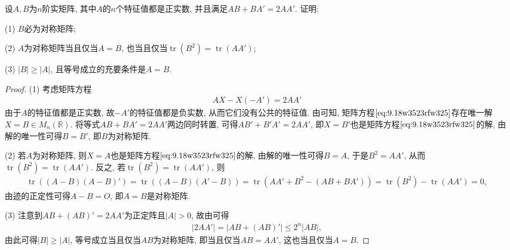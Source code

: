 \documentclass[../../main.tex]{subfiles}
\begin{document}
\begin{example}
设\( A,B \)为\( n \)阶实矩阵, 其中\( A \)的\( n \)个特征值都是正实数, 并且满足\( AB + BA' = 2AA' \). 证明:

(1) \( B \)必为对称矩阵;

(2) \( A \)为对称矩阵当且仅当\( A = B \), 也当且仅当\( \operatorname{tr}(B^2) = \operatorname{tr}(AA') \);

(3) \( |B| \geqslant |A| \), 且等号成立的充要条件是\( A = B \).
\end{example}
\begin{proof}
(1) 考虑矩阵方程
\begin{align}\label{eq:9.18w3523rfw325}
AX - X(-A') = 2AA'
\end{align}
由于\( A \)的特征值都是正实数, 故\( -A' \)的特征值都是负实数, 从而它们没有公共的特征值. 由可知, 矩阵方程\(\eqref{eq:9.18w3523rfw325}\)存在唯一解\( X = B \in M_n(\mathbb{R}) \). 将等式\( AB + BA' = 2AA' \)两边同时转置, 可得\( AB' + B'A' = 2AA' \), 即\( X = B' \)也是矩阵方程\(\eqref{eq:9.18w3523rfw325}\)的解, 由解的唯一性可得\( B = B' \), 即\( B \)为对称矩阵.

(2) 若\( A \)为对称矩阵, 则\( X = A \)也是矩阵方程\(\eqref{eq:9.18w3523rfw325}\)的解, 由解的唯一性可得\( B = A \), 于是\( B^2 = AA' \), 从而\( \operatorname{tr}(B^2) = \operatorname{tr}(AA') \). 反之, 若\( \operatorname{tr}(B^2) = \operatorname{tr}(AA') \), 则
\begin{align*}
\operatorname{tr}\left((A - B)(A - B)'\right) = \operatorname{tr}\left((A - B)(A' - B)\right) = \operatorname{tr}\left(AA' + B^2 - (AB + BA')\right) = \operatorname{tr}(B^2) - \operatorname{tr}(AA') = 0,
\end{align*}
由迹的正定性可得\( A - B = O \), 即\( A = B \)是对称矩阵.

(3) 注意到\( AB + (AB)' = 2AA' \)为正定阵且\( |A| > 0 \), 故由可得
\begin{align*}
|2AA' |=\left| AB+(AB)' \right|\leqslant 2^n|AB|, 
\end{align*}
由此可得\( |B| \geqslant |A| \), 等号成立当且仅当\( AB \)为对称矩阵, 即当且仅当\( AB = AA' \), 这也当且仅当\( A = B \). 

\end{proof}
\end{document}
